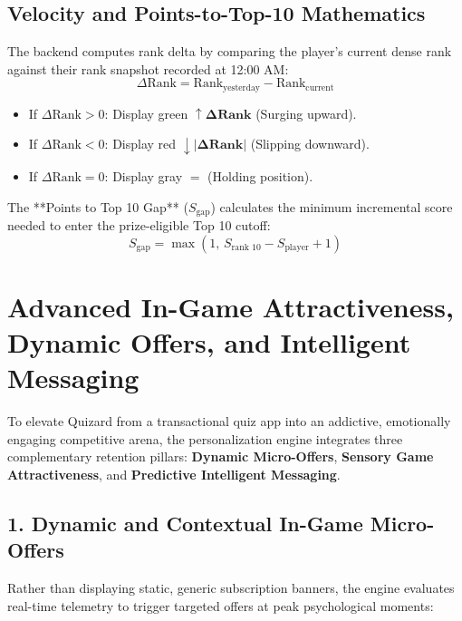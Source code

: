 \subsection{Velocity and Points-to-Top-10 Mathematics}
The backend computes rank delta by comparing the player's current dense rank against their rank snapshot recorded at 12:00 AM:
\begin{equation}
\Delta \text{Rank} = \text{Rank}_{\text{yesterday}} - \text{Rank}_{\text{current}}
\end{equation}
\begin{itemize}
    \item If $\Delta \text{Rank} > 0$: Display green $\boldsymbol{\uparrow \Delta\text{Rank}}$ (Surging upward).
    \item If $\Delta \text{Rank} < 0$: Display red $\boldsymbol{\downarrow |\Delta\text{Rank}|}$ (Slipping downward).
    \item If $\Delta \text{Rank} = 0$: Display gray $=$ (Holding position).
\end{itemize}

The **Points to Top 10 Gap** ($S_{\text{gap}}$) calculates the minimum incremental score needed to enter the prize-eligible Top 10 cutoff:
\begin{equation}
S_{\text{gap}} = \max\left(1, \, S_{\text{rank 10}} - S_{\text{player}} + 1\right)
\end{equation}


\section{Advanced In-Game Attractiveness, Dynamic Offers, and Intelligent Messaging}
To elevate Quizard from a transactional quiz app into an addictive, emotionally engaging competitive arena, the personalization engine integrates three complementary retention pillars: \textbf{Dynamic Micro-Offers}, \textbf{Sensory Game Attractiveness}, and \textbf{Predictive Intelligent Messaging}.

\subsection{1. Dynamic and Contextual In-Game Micro-Offers}
Rather than displaying static, generic subscription banners, the engine evaluates real-time telemetry to trigger targeted offers at peak psychological moments:

